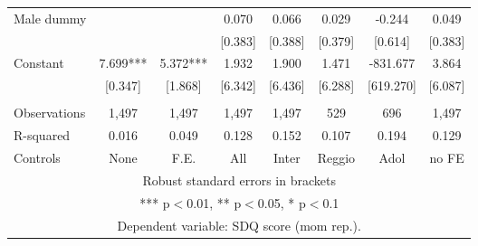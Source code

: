 \begin{tabular}{lccccccc}
Male dummy &  &  & 0.070 & 0.066 & 0.029 & -0.244 & 0.049 \\
 &  &  & [0.383] & [0.388] & [0.379] & [0.614] & [0.383] \\
Constant & 7.699*** & 5.372*** & 1.932 & 1.900 & 1.471 & -831.677 & 3.864 \\
 & [0.347] & [1.868] & [6.342] & [6.436] & [6.288] & [619.270] & [6.087] \\
 &  &  &  &  &  &  &  \\
Observations & 1,497 & 1,497 & 1,497 & 1,497 & 529 & 696 & 1,497 \\
R-squared & 0.016 & 0.049 & 0.128 & 0.152 & 0.107 & 0.194 & 0.129 \\
 Controls & None & F.E. & All & Inter & Reggio & Adol & no FE \\ \hline
\multicolumn{8}{c}{ Robust standard errors in brackets} \\
\multicolumn{8}{c}{ *** p$<$0.01, ** p$<$0.05, * p$<$0.1} \\
\multicolumn{8}{c}{ Dependent variable: SDQ score (mom rep.).} \\
\end{tabular}
